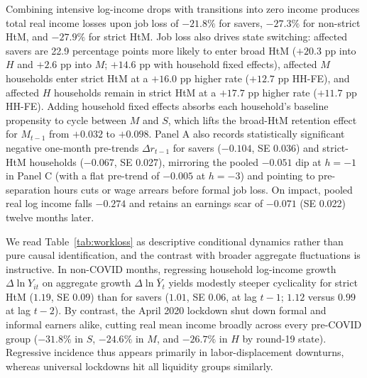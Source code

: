 \documentclass[11pt]{article}
\begin{document}
Combining intensive log-income drops with transitions into zero income produces total real income losses upon job loss of $-21.8\%$ for savers, $-27.3\%$ for non-strict HtM, and $-27.9\%$ for strict HtM. Job loss also drives state switching: affected savers are 22.9 percentage points more likely to enter broad HtM ($+20.3$ pp into $H$ and $+2.6$ pp into $M$; $+14.6$ pp with household fixed effects), affected $M$ households enter strict HtM at a $+16.0$ pp higher rate ($+12.7$ pp HH-FE), and affected $H$ households remain in strict HtM at a $+17.7$ pp higher rate ($+11.7$ pp HH-FE). Adding household fixed effects absorbs each household's baseline propensity to cycle between $M$ and $S$, which lifts the broad-HtM retention effect for $M_{t-1}$ from $+0.032$ to $+0.098$. Panel A also records statistically significant negative one-month pre-trends $\Delta r_{t-1}$ for savers ($-0.104$, SE 0.036) and strict-HtM households ($-0.067$, SE 0.027), mirroring the pooled $-0.051$ dip at $h = -1$ in Panel C (with a flat pre-trend of $-0.005$ at $h = -3$) and pointing to pre-separation hours cuts or wage arrears before formal job loss. On impact, pooled real log income falls $-0.274$ and retains an earnings scar of $-0.071$ (SE 0.022) twelve months later.

We read Table~\ref{tab:workloss} as descriptive conditional dynamics rather than pure causal identification, and the contrast with broader aggregate fluctuations is instructive. In non-COVID months, regressing household log-income growth $\Delta \ln Y_{it}$ on aggregate growth $\Delta \ln \bar{Y}_t$ yields modestly steeper cyclicality for strict HtM ($1.19$, SE $0.09$) than for savers ($1.01$, SE $0.06$, at lag $t-1$; $1.12$ versus $0.99$ at lag $t-2$). By contrast, the April 2020 lockdown shut down formal and informal earners alike, cutting real mean income broadly across every pre-COVID group ($-31.8\%$ in $S$, $-24.6\%$ in $M$, and $-26.7\%$ in $H$ by round-19 state). Regressive incidence thus appears primarily in labor-displacement downturns, whereas universal lockdowns hit all liquidity groups similarly.
\end{document}
